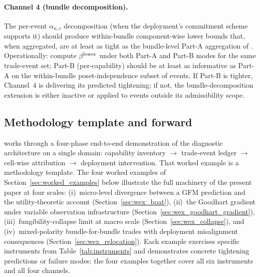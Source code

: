 \paragraph{Channel 4 (bundle decomposition).}
The per-event $\alpha_{n,c}$ decomposition (when the
deployment's commitment scheme supports it) should produce
within-bundle component-wise lower bounds that, when
aggregated, are at least as tight as the bundle-level Part-A
aggregation of \citep[Theorem~2]{lasser2026paper8a}.
Operationally: compute $\beta^{\mathrm{lower}}$ under both Part-A and Part-B
modes for the same trade-event set; Part-B (per-capability)
should be at least as informative as Part-A on the
within-bundle poset-independence subset of events.  If
Part-B is tighter, Channel~4 is delivering its predicted
tightening; if not, the bundle-decomposition extension is
either inactive or applied to events outside its
admissibility scope.

\subsection{Methodology template and forward}
\label{sec:methodology_template}

\citep[Section~6]{lasser2026paper8b} works through a four-phase
end-to-end demonstration of the
\citep[Need~Sufficiency]{lasser2026paper8b} diagnostic
architecture on a single domain: capability inventory $\to$
trade-event ledger $\to$ cell-wise attribution $\to$
deployment intervention.  That worked example is a methodology
template.  The four worked examples of
Section~\ref{sec:worked_examples} below illustrate the full
machinery of the present paper at four scales: (i)~micro-level
divergence between a GFM prediction and the utility-theoretic
account (Section~\ref{sec:wex_boat}), (ii)~the Goodhart
gradient under variable observation infrastructure
(Section~\ref{sec:wex_goodhart_gradient}),
(iii)~fungibility-collapse limit at macro scale
(Section~\ref{sec:wex_collapse}), and (iv)~mixed-polarity
bundle-for-bundle trades with deployment misalignment
consequences (Section~\ref{sec:wex_relocation}).  Each example
exercises specific instruments from Table~\ref{tab:instruments}
and demonstrates concrete tightening predictions or failure
modes; the four examples together cover all six instruments
and all four channels.
